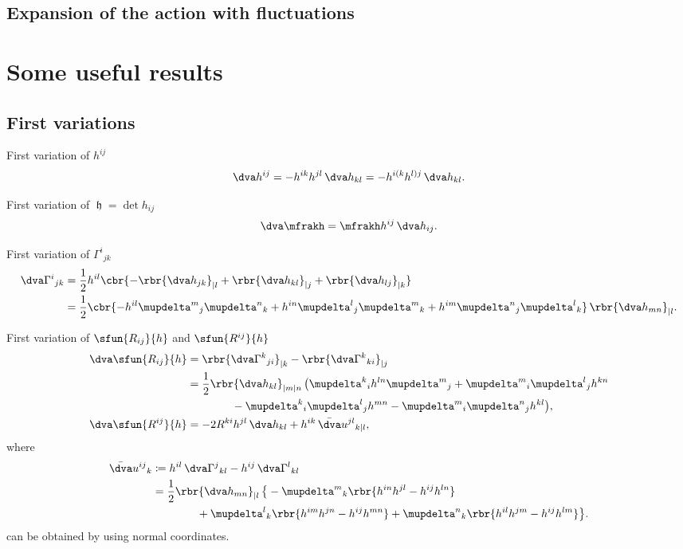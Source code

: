 \documentclass[a4paper,11pt]{article}
\begin{document}
\subsection{Expansion of the action with fluctuations}

\appendix

\section*{Some useful results}

\subsection*{First variations}

First variation of $h^{ij}$
\begin{align}
\dva h^{ij} = -h^{ik}h^{jl}\,\dva h_{kl} = - h^{i(k}h^{l)j}\,\dva h_{kl}.
\end{align}

First variation of $\mfrakh = \det h_{ij}$
\begin{align}
\dva \mfrakh = \mfrakh h^{ij}\,\dva h_{ij}.
\end{align}

First variation of $\Gamma^i{}_{jk}$
\begin{align}
\dva \Gamma^{i}{}_{jk} &= \frac{1}{2} h^{il}
\cbr{-\rbr{\dva h_{jk}}_{|l} + \rbr{\dva h_{kl}}_{|j} + \rbr{\dva h_{lj}}_{|k}}
\\
&= \frac{1}{2} \cbr{-h^{il}\mupdelta^m{}_j\mupdelta^n{}_k
+h^{in}\mupdelta^l{}_j\mupdelta^m{}_k
+h^{im}\mupdelta^n{}_j\mupdelta^l{}_k}\,\rbr{\dva h_{mn}}_{|l}.
\end{align}

First variation of $\sfun{R_{ij}}{h}$ and $\sfun{R^{ij}}{h}$
\begin{align}
\dva \sfun{R_{ij}}{h} &=
\rbr{\dva\Gamma^k{}_{ji}}_{|k} - \rbr{\dva\Gamma^k{}_{ki}}_{|j}
\label{eq:var-R_{ij}}
\\
&=
\frac{1}{2}\rbr{\dva h_{kl}}_{|m|n}\,\big(
\mupdelta^k{}_ih^{ln}\mupdelta^m{}_j+
\mupdelta^m{}_i\mupdelta^l{}_jh^{kn}
\nonumber \\
&\qquad\qquad
-\mupdelta^k{}_i\mupdelta^l{}_jh^{mn}
-\mupdelta^m{}_i\mupdelta^n{}_jh^{kl}\big),
\\
\dva \sfun{R^{ij}}{h} &=
-2R^{ki}h^{jl}\,\dva h_{kl} + h^{ik}\,\bar{\dva}u^{jl}{}_{k|l},
\end{align}
where
\begin{align}
\bar{\dva}u^{ij}{}_{k} &\coloneqq
h^{il}\,\dva\Gamma^{j}{}_{kl} - h^{ij}\,\dva\Gamma^{l}{}_{kl}
\\
&= 
\frac{1}{2}\rbr{\dva h_{mn}}_{|l}\,\big\{
-\mupdelta^m{}_k\rbr{h^{in}h^{jl}-h^{ij}h^{ln}}
\nonumber \\
&\qquad\qquad
+\mupdelta^l{}_k\rbr{h^{im}h^{jn}-h^{ij}h^{mn}}
+\mupdelta^n{}_k\rbr{h^{il}h^{jm}-h^{ij}h^{lm}}\big\}.
\end{align}
 can be obtained by using normal coordinates.
\end{document}
